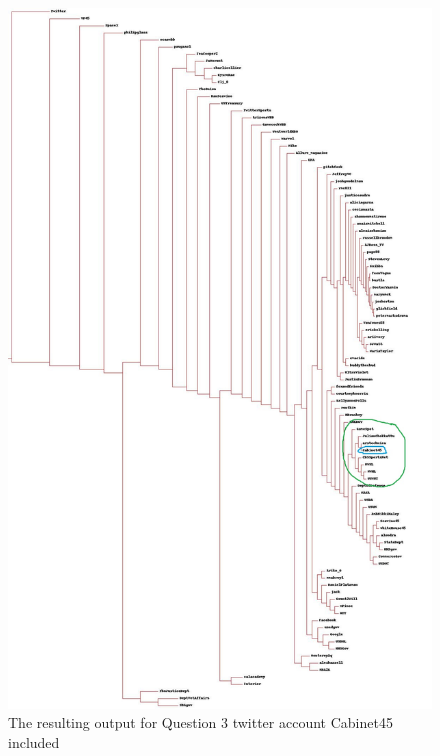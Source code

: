 \documentclass[12pt]{article}
\begin{document}
\subsection*{\color{blue}{Answer}}
 
 \begin{figure}[H]
            \centering
            \includegraphics[width=\textwidth,height=\textheight,keepaspectratio]{tweetdataOld.jpeg}
            \caption{ The resulting output for Question 3 twitter account Cabinet45 included}
            \label{fig:1}
\end{figure}
\end{document}
